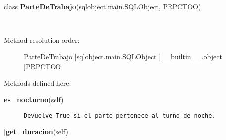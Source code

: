  \par 


~\\
class {\bf ParteDeTrabajo}(sqlobject.main.SQLObject, PRPCTOO)
    
{\tt ~~~}~
\begin{description}\item[Method resolution order:
]ParteDeTrabajo
]sqlobject.main.SQLObject
]\_\_builtin\_\_.object
]PRPCTOO
\end{description}

Methods defined here:\\
\begin{description}\item[{\bf es\_nocturno}(self)]{\tt Devuelve~True~si~el~parte~pertenece~al~turno~de~noche.}\end{description}

\begin{description}\item[{\bf get\_duracion}(self)\end{description}


